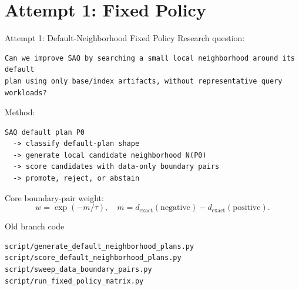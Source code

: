 \documentclass[aspectratio=169,10pt]{beamer}
\begin{document}
\section{Attempt 1: Fixed Policy}

\begin{frame}[fragile]{Attempt 1: Default-Neighborhood Fixed Policy}
\small
Research question:
\begin{lstlisting}
Can we improve SAQ by searching a small local neighborhood around its default
plan using only base/index artifacts, without representative query workloads?
\end{lstlisting}

Method:
\begin{lstlisting}
SAQ default plan P0
  -> classify default-plan shape
  -> generate local candidate neighborhood N(P0)
  -> score candidates with data-only boundary pairs
  -> promote, reject, or abstain
\end{lstlisting}

Core boundary-pair weight:
\[
w = \exp(-m/\tau),
\quad
m=d_{\mathrm{exact}}(\text{negative})-d_{\mathrm{exact}}(\text{positive}).
\]

\begin{block}{Old branch code}
\begin{lstlisting}
script/generate_default_neighborhood_plans.py
script/score_default_neighborhood_plans.py
script/sweep_data_boundary_pairs.py
script/run_fixed_policy_matrix.py
\end{lstlisting}
\end{block}
\end{frame}
\end{document}
